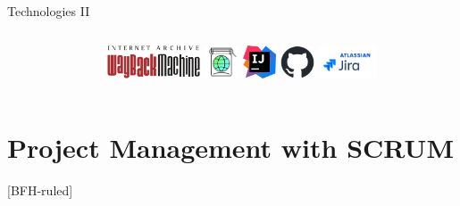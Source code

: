 \documentclass[
    ngerman,%
    authorontitle=true,
]{bfhbeamer}
\begin{document}
\begin{frame}{Technologies II}
\begin{columns}
\begin{column}{0.7\textwidth}
            \end{column}
            \begin{column}{0.3\textwidth}
                \includegraphics[height=1cm]{pictures/Wayback_Machine_logo}
                \vspace{1em}
                \includegraphics[height=1cm]{pictures/archive_today_logo}
                \vspace{1em}
                \includegraphics[height=1cm]{pictures/IntelliJ_IDEA_Icon}
                \vspace{1em}
                \includegraphics[height=1cm]{pictures/github-mark}
                \vspace{1em}
                \includegraphics[height=1cm]{pictures/jira_logo}
            \end{column}
        \end{columns}
    \end{frame}




    \section{Project Management with SCRUM}
    [BFH-ruled]
    \frame{\sectionpage}
\end{document}
